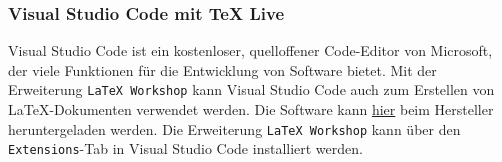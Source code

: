 \subsubsection{Visual Studio Code mit TeX Live}
\label{sec:visual_studio_code_mit_tex_live}
Visual Studio Code ist ein kostenloser, quelloffener Code-Editor von Microsoft, der viele Funktionen für die Entwicklung von Software bietet. Mit der Erweiterung \texttt{LaTeX Workshop} kann Visual Studio Code auch zum Erstellen von \LaTeX{}-Dokumenten verwendet werden. Die Software kann \href{https://code.visualstudio.com/Download}{hier} beim Hersteller heruntergeladen werden.
Die Erweiterung \texttt{LaTeX Workshop} kann über den \texttt{Extensions}-Tab in Visual Studio Code installiert werden.




































\newpage